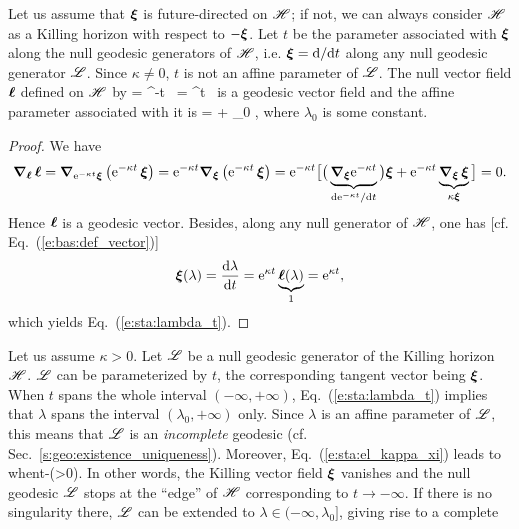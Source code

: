 Let us assume that $\bm{\xi}$ is future-directed on $\mathscr{H}$; if not, we can
always consider $\mathscr{H}$ as a Killing horizon with respect to $-\bm{\xi}$.
Let $t$ be the parameter
associated with $\bm{\xi}$ along the null geodesic generators of $\mathscr{H}$, i.e.
$\bm{\xi} = \mathrm{d}/\mathrm{d} t$ along any null geodesic generator $\mathscr{L}$.
Since $\kappa\not=0$, $t$ is not an affine parameter of $\mathscr{L}$.
The null vector field $\bm{\ell}$ defined on $\mathscr{H}$ by
\be \label{e:sta:el_kappa_xi}
    \wl = ^{-\kappa t} \, \w{\xi} \quad \iff\quad
    \w{\xi} = ^{\kappa t} \, \wl
\ee
is a geodesic vector field and the affine parameter associated with it is
\be \label{e:sta:lambda_t}
    \lambda =  + \lambda_0 ,
\ee
where $\lambda_0$ is some constant.
\begin{proof}
We have
\[
\bm{\nabla}_{\bm{\ell}}\, \bm{\ell} = \bm{\nabla}_{\mathrm{e}^{-\kappa t} \bm{\xi}} \left( \mathrm{e}^{-\kappa t} \, \bm{\xi} \right) = \mathrm{e}^{-\kappa t} \bm{\nabla}_{\bm{\xi}} \left( \mathrm{e}^{-\kappa t} \, \bm{\xi} \right)
= \mathrm{e}^{-\kappa t} \big[ \big( \underbrace{\bm{\nabla}_{\bm{\xi}} \mathrm{e}^{-\kappa t}}_{\mathrm{d} \mathrm{e}^{-\kappa t}/\mathrm{d} t} \big) \bm{\xi}
    + \mathrm{e}^{-\kappa t} \underbrace{\bm{\nabla}_{\bm{\xi}}\, \bm{\xi}}_{\kappa\bm{\xi}}
    \big] = 0 .
\]
Hence $\bm{\ell}$ is a geodesic vector. Besides, along any null generator of $\mathscr{H}$,
one has [cf. Eq.~(\ref{e:bas:def_vector})]
\[
    \bm{\xi}(\lambda) = \frac{\mathrm{d}\lambda}{\mathrm{d} t} = \mathrm{e}^{\kappa t}
    \underbrace{\bm{\ell}(\lambda)}_{1} = \mathrm{e}^{\kappa t} ,
\]
which yields Eq.~(\ref{e:sta:lambda_t}).
\end{proof}
Let us assume $\kappa>0$. Let $\mathscr{L}$ be a null geodesic generator of the Killing
horizon $\mathscr{H}$. $\mathscr{L}$ can be parameterized by $t$, the corresponding
tangent vector being $\bm{\xi}$. When $t$ spans the whole interval $(-\infty,+\infty)$,
Eq.~(\ref{e:sta:lambda_t}) implies that $\lambda$ spans the
interval $(\lambda_0,+\infty)$ only. Since $\lambda$ is an affine parameter of $\mathscr{L}$,
this means that $\mathscr{L}$ is an \emph{incomplete} geodesic (cf. Sec.~\ref{s:geo:existence_uniqueness}).
Moreover, Eq.~(\ref{e:sta:el_kappa_xi}) leads to
\be \label{e:sta:xi_zero_t_inf}
    \w{\xi}  \quad\mbox{when}\quad t\rightarrow -\infty \qquad (\kappa>0).
\ee
In other words, the Killing vector field $\bm{\xi}$ vanishes and
the null geodesic $\mathscr{L}$ stops at the ``edge'' of $\mathscr{H}$ corresponding to
$t\rightarrow -\infty$.
If there is no singularity there, $\mathscr{L}$ can be
extended to $\lambda\in(-\infty,\lambda_0]$, giving rise to a complete
